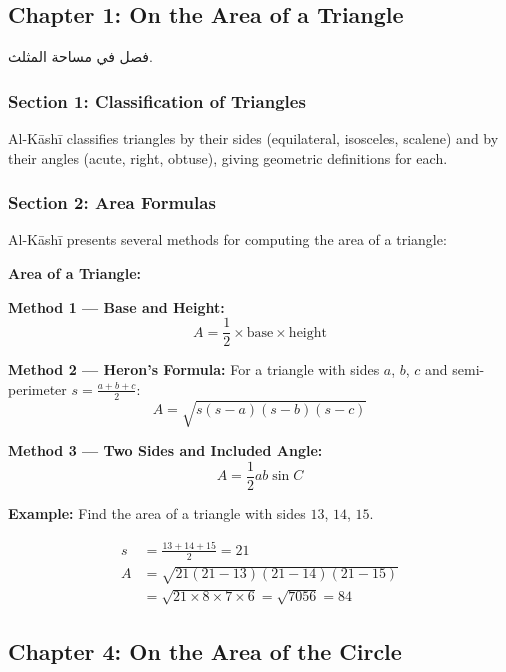 \documentclass[11pt,a4paper]{article}
\newenvironment{arabicbox}{%
  \begin{framed}
  \begin{minipage}{\linewidth-2\fboxsep-2\fboxrule}
  \setlength{\parindent}{0pt}
  \linespread{1.3}\selectfont
}{%
  \end{minipage}
  \end{framed}
}
\newenvironment{mathalgo}{%
  \par\vspace{0.3cm}
  \begin{framed}
  \setlength{\parindent}{0pt}
}{%
  \end{framed}
  \par\vspace{0.3cm}
}
\begin{document}
\subsection{Chapter 1: On the Area of a Triangle}

\begin{arabicbox}
\begin{Arabic}
فصل في مساحة المثلث.
\end{Arabic}
\end{arabicbox}

\vspace{0.3cm}

\subsubsection{Section 1: Classification of Triangles}

Al-K\=ash\=i classifies triangles by their sides (equilateral, isosceles,
scalene) and by their angles (acute, right, obtuse), giving geometric
definitions for each.

\subsubsection{Section 2: Area Formulas}

Al-K\=ash\=i presents several methods for computing the area of a triangle:

\begin{mathalgo}
\textbf{Area of a Triangle:}

\textbf{Method 1 --- Base and Height:}
\[
A = \frac{1}{2} \times \text{base} \times \text{height}
\]

\textbf{Method 2 --- Heron's Formula:}
For a triangle with sides $a$, $b$, $c$ and semi-perimeter $s =
\frac{a+b+c}{2}$:
\[
A = \sqrt{s(s-a)(s-b)(s-c)}
\]

\textbf{Method 3 --- Two Sides and Included Angle:}
\[
A = \frac{1}{2} ab \sin C
\]
\end{mathalgo}

\noindent\textbf{Example:} Find the area of a triangle with sides $13$,
$14$, $15$.

\begin{align*}
s &= \frac{13 + 14 + 15}{2} = 21 \\
A &= \sqrt{21(21-13)(21-14)(21-15)} \\
&= \sqrt{21 \times 8 \times 7 \times 6} = \sqrt{7056} = 84
\end{align*}

\subsection{Chapter 4: On the Area of the Circle}
\end{document}

